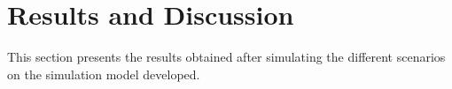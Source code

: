 \section{Results and Discussion}

This section presents the results obtained after simulating the different scenarios on the simulation model developed.  